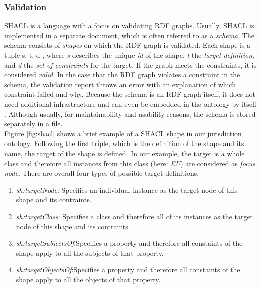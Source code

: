 \documentclass[
  a4paper,  %
  twoside,  %
  bibliography=totoc,
  headsepline,
  cleardoublepage=empty,
  parskip=half,
  draft=false
]{scrbook}
\begin{document}
\subsubsection{Validation} \label{sec:validation}
\acrfull{SHACL} is a language with a focus on validating RDF graphs. Usually, \acrshort{SHACL} is implemented in a separate document, which is often referred to as a \textit{schema}. The schema consists of \textit{shapes} on which the RDF graph is validated. Each shape is a tuple \textlangle s, t, d \textrangle, where \textit{s} describes the unique \textit{id} of the shape, \textit{t} the \textit{target definition}, and \textit{d} the \textit{set of constraints} for the target. If the graph meets the constraints, it is considered \textit{valid}. In the case that the RDF graph violates a constraint in the schema, the validation report throws an error with an explanation of which constraint failed and why. Because the schema is an RDF graph itself, it does not need additional infrastructure and can even be embedded in the ontology by itself \cite{Pareti.2021}. Although usually, for maintainability and usability reasons, the schema is stored separately in a file.\\
Figure \ref{fig:shacl} shows a brief example of a \acrshort{SHACL} shape in our jurisdiction ontology. Following the first triple, which is the definition of the shape and its name, the target of the shape is defined. In our example, the target is a whole class and therefore all instances from this class (here: \textit{EU}) are considered as \textit{focus node}. There are overall four types of possible target definitions. 
\begin{enumerate}
    \item \textit{sh:targetNode}: Specifies an individual instance as the target node of this shape and its contraints. 
    \item \textit{sh:targetClass}: Specifies a class and therefore all of its instances as the target node of this shape and its contraints. 
    \item \textit{sh:targetSubjectsOf}:Specifies a property and therefore all constaints of the shape apply to all the subjects of that property.
    \item \textit{sh:targetObjectsOf}:Specifies a property and therefore all constaints of the shape apply to all the objects of that property.
\end{enumerate}
\end{document}
